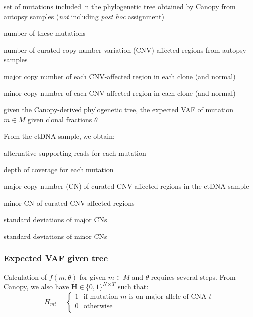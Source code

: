 \startsinglespace
\begin{description}[noitemsep]
    \renewcommand{\makelabel}[1]{#1:}
    \item[$M$] set of mutations included in the phylogenetic tree obtained by Canopy from autopsy samples (\emph{not} including \textit{post hoc} assignment)
    \item[$N=|M|$] number of these mutations
    \item[$T$] number of curated copy number variation (CNV)-affected regions from autopsy samples
    \item[$\CM \in \mathbb{Z}^{T \times K}$] major copy number of each CNV-affected region in each clone (and normal)
    \item[$\Cm \in \mathbb{Z}^{T \times K}$] minor copy number of each CNV-affected region in each clone (and normal)
    \item[$f(m,\theta) \in {[0..1]}$] given the Canopy-derived phylogenetic tree, the expected VAF of mutation $m \in M$ given clonal fractions $\theta$
\end{description}
\startdoublespace

From the ctDNA sample, we obtain:
\startsinglespace
\begin{description}[noitemsep]
    \renewcommand{\makelabel}[1]{#1:}
    \item[$\vec{r} \in \mathbb{Z}^N$] alternative-supporting reads for each mutation
    \item[$\vec{x} \in \mathbb{Z}^N$] depth of coverage for each mutation
    \item[$\vec{W}^\text{M} \in \mathbb{R}^T$] major copy number (CN) of curated CNV-affected regions in the ctDNA sample
    \item[$\vec{W}^\text{m} \in \mathbb{R}^T$] minor CN of curated CNV-affected regions
    \item[$\vec{\varepsilon}^\text{M} \in \mathbb{R}^T$] standard deviations of major CNs
    \item[$\vec{\varepsilon}^\text{m} \in \mathbb{R}^T$] standard deviations of minor CNs
\end{description}
\startdoublespace

\subsubsection{Expected VAF given tree}
Calculation of $f(m,\theta)$ for given $m \in M$ and $\theta$ requires several steps. From Canopy, we also have $\mathbf{H} \in \{0, 1\}^{N \times T}$ such that:
\begin{equation*}
    H_{mt} = \begin{cases}
        1 & \text{if mutation } m \text { is on major allele of CNA } t \\
        0 & \text{otherwise}\\
        \end{cases}
\end{equation*}

